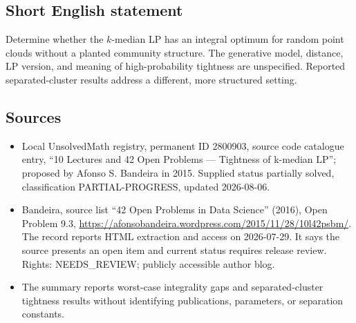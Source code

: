 \documentclass[11pt]{article}
\begin{document}
\subsection{Short English statement}
Determine whether the $k$-median LP has an integral optimum for random point clouds without a planted community structure. The generative model, distance, LP version, and meaning of high-probability tightness are unspecified. Reported separated-cluster results address a different, more structured setting.
\subsection{Sources}
\begin{itemize}
\item Local UnsolvedMath registry, permanent ID 2800903, source code catalogue entry, ``10 Lectures and 42 Open Problems --- Tightness of k-median LP''; proposed by Afonso S. Bandeira in 2015. Supplied status partially solved, classification PARTIAL-PROGRESS, updated 2026-08-06.
\item Bandeira, source list ``42 Open Problems in Data Science'' (2016), Open Problem 9.3, \url{https://afonsobandeira.wordpress.com/2015/11/28/10l42psbm/}. The record reports HTML extraction and access on 2026-07-29. It says the source presents an open item and current status requires release review. Rights: NEEDS\_REVIEW; publicly accessible author blog.
\item The summary reports worst-case integrality gaps and separated-cluster tightness results without identifying publications, parameters, or separation constants.
\end{itemize}
\end{document}

